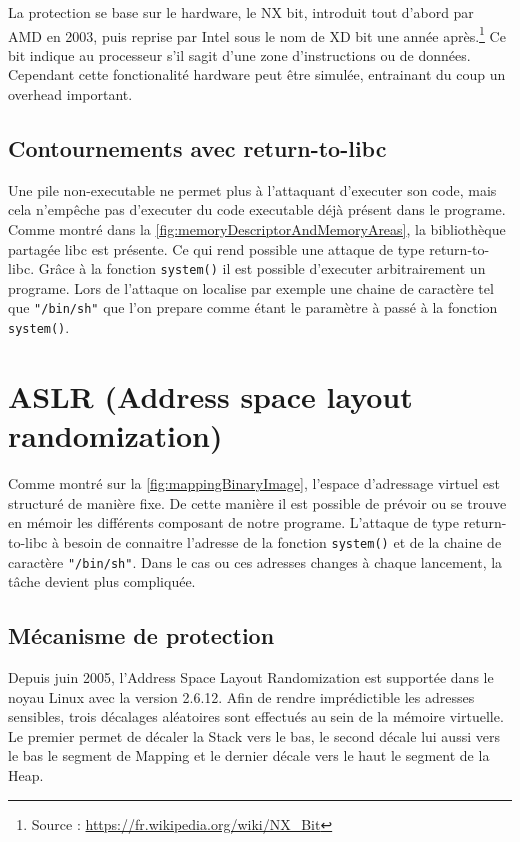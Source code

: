 La protection se base sur le hardware, le NX bit, introduit tout d'abord par AMD en 2003, puis reprise par Intel sous le nom de XD bit une année après.\footnote{Source : \url{https://fr.wikipedia.org/wiki/NX_Bit}} Ce bit indique au processeur s'il sagit d'une zone d'instructions ou de données. Cependant cette fonctionalité hardware peut être simulée, entrainant du coup un overhead important.

\subsection{Contournements avec return-to-libc}

Une pile non-executable ne permet plus à l'attaquant d'executer son code, mais cela n'empêche pas d'executer du code executable déjà présent dans le programe. Comme montré dans la \autoref{fig:memoryDescriptorAndMemoryAreas}, la bibliothèque partagée libc est présente. Ce qui rend possible une attaque de type return-to-libc. Grâce à la fonction \texttt{system()} il est possible d'executer arbitrairement un programe. Lors de l'attaque on localise par exemple une chaine de caractère tel que \texttt{"/bin/sh"} que l'on prepare comme étant le paramètre à passé à la fonction  \texttt{system()}.

\section{ASLR (Address space layout randomization)}

Comme montré sur la \autoref{fig:mappingBinaryImage}, l'espace d'adressage virtuel est structuré de manière fixe. De cette manière il est possible de prévoir ou se trouve en mémoir les différents composant de notre programe. L'attaque de type return-to-libc à besoin de connaitre l'adresse de la fonction \texttt{system()} et de la chaine de caractère \texttt{"/bin/sh"}. Dans le cas ou ces adresses changes à chaque lancement, la tâche devient plus compliquée.

\newpage

\subsection{Mécanisme de protection}

Depuis juin 2005, l'Address Space Layout Randomization est supportée dans le noyau Linux avec la version 2.6.12. Afin de rendre imprédictible les adresses sensibles, trois décalages aléatoires sont effectués au sein de la mémoire virtuelle. Le premier permet de décaler la Stack vers le bas, le second décale lui aussi vers le bas le segment de Mapping et le dernier décale vers le haut le segment de la Heap.

